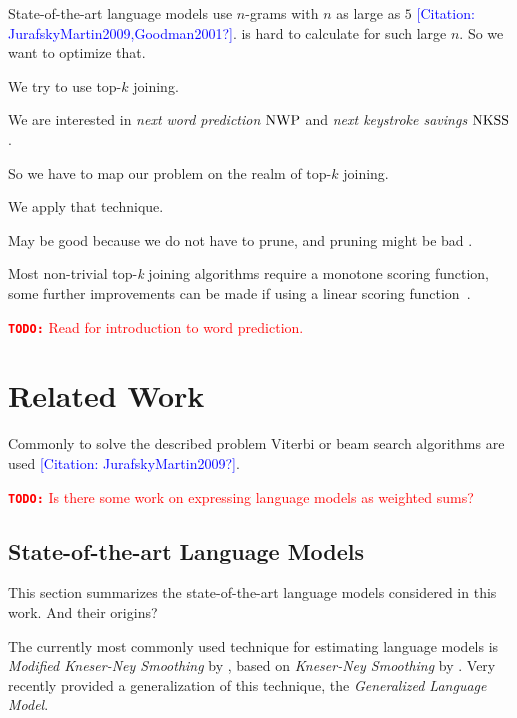 \documentclass[11pt,a4paper]{report}
\newenvironment{draft}{\color{draftcolor}}{}
\newcommand{\todo}[1]{\textcolor{red}{{\footnotesize\textbf{\texttt{TODO:}}} #1}}
\newcommand{\mbref}[1]{\textcolor{blue}{\footnotesize[Citation: #1?]}}
\begin{document}
State-of-the-art language models use $n$-grams with $n$ as large as $5$
\mbref{JurafskyMartin2009,Goodman2001}.
\begin{draft}
 is hard to calculate for such large $n$.
So we want to optimize that.
\end{draft}

\begin{draft}
We try to use top-$k$ joining.

We are interested in \emph{next word prediction} $\NWP$ and
\emph{next keystroke savings} $\NKSS$.

So we have to map our problem on the realm of top-$k$ joining.

We apply that technique.

May be good because we do not have to prune, and pruning might be bad
\parencite{Stolcke2000,Chelba2013,Chelba2010,Siivola2007}.

Most non-trivial top-\emph{k} joining algorithms require a monotone scoring
function, some further improvements can be made if using a linear scoring
function~\parencite{Ilyas2008}.
\end{draft}

\todo{Read \cite{Bickel2005} for introduction to word prediction.}

\chapter{Related Work}

\begin{draft}
Commonly to solve the described problem Viterbi or beam search algorithms are
used \mbref{JurafskyMartin2009}.
\end{draft}

\todo{Is there some work on expressing language models as weighted sums?}

\section{State-of-the-art Language Models}

\begin{draft}
This section summarizes the state-of-the-art language models considered in this
work.
And their origins?
\end{draft}

The currently most commonly used \parencite{JurafskyMartin2009,Chelba2013}
technique for estimating language models is \emph{Modified Kneser-Ney Smoothing}
by \cite{ChenGoodman1996,ChenGoodman1998,ChenGoodman1999}, based on
\emph{Kneser-Ney Smoothing} by \cite{KneserNey1995}.
Very recently \cite{Pickhardt2014} provided a generalization of this technique,
the \emph{Generalized Language Model}.
\end{document}
